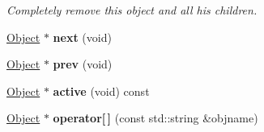 \begin{DoxyCompactItemize}
\begin{DoxyCompactList}\small\item\em Completely remove this object and all his children. \end{DoxyCompactList}\item 
\hypertarget{class_scene_a70fcdad192a4c6ff508125de8af6cf4d}{\hyperlink{class_object}{Object} $\ast$ {\bfseries next} (void)}\label{class_scene_a70fcdad192a4c6ff508125de8af6cf4d}

\item 
\hypertarget{class_scene_ac852d5d763eb35b4908c9aa7ea54d1ae}{\hyperlink{class_object}{Object} $\ast$ {\bfseries prev} (void)}\label{class_scene_ac852d5d763eb35b4908c9aa7ea54d1ae}

\item 
\hypertarget{class_scene_ad0ea1a6bcf7815c63988bd937f06eb23}{\hyperlink{class_object}{Object} $\ast$ {\bfseries active} (void) const }\label{class_scene_ad0ea1a6bcf7815c63988bd937f06eb23}

\item 
\hypertarget{class_scene_ae9b69d8db8a46991017635f22e45baad}{\hyperlink{class_object}{Object} $\ast$ {\bfseries operator\mbox{[}$\,$\mbox{]}} (const std\-::string \&objname)}\label{class_scene_ae9b69d8db8a46991017635f22e45baad}

\end{DoxyCompactItemize}
